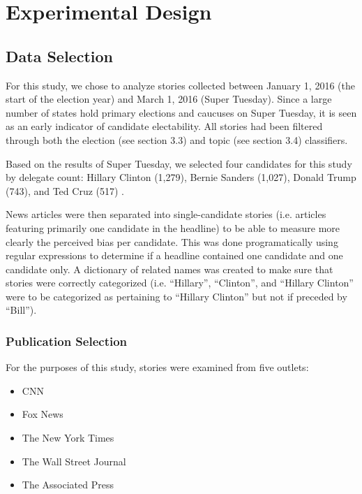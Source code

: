 \chapter{Experimental Design}


\section {Data Selection} 

For this study, we chose to analyze stories collected between January 1, 2016 (the start of the election year) and March 1, 2016 (Super Tuesday). Since a large number of states hold primary elections and caucuses on Super Tuesday, it is seen as an early indicator of candidate electability. All stories had been filtered through both the election (see section 3.3) and topic (see section 3.4) classifiers.

Based on the results of Super Tuesday, we selected four candidates for this study by delegate count: Hillary Clinton (1,279), Bernie Sanders (1,027), Donald Trump (743), and Ted Cruz (517) \cite{March45online}.

News articles were then separated into single-candidate stories (i.e. articles featuring primarily one candidate in the headline) to be able to measure more clearly the perceived bias per candidate. This was done programatically using regular expressions to determine if a headline contained one candidate and one candidate only. A dictionary of related names was created to make sure that stories were correctly categorized (i.e. ``Hillary'', ``Clinton'', and ``Hillary Clinton'' were to be categorized as pertaining to ``Hillary Clinton'' but not if preceded by ``Bill'').

\subsection {Publication Selection}

For the purposes of this study, stories were examined from five outlets: 

\begin{itemize}
\itemsep-1em 
  \item CNN
  \item Fox News  
  \item The New York Times
  \item The Wall Street Journal 
  \item The Associated Press 
\end{itemize}

